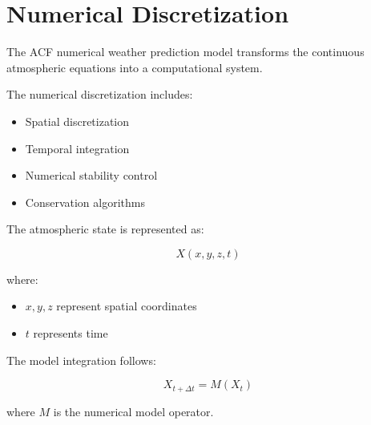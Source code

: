 \section{Numerical Discretization}


The ACF numerical weather prediction model transforms the
continuous atmospheric equations into a computational system.



The numerical discretization includes:


\begin{itemize}

\item Spatial discretization

\item Temporal integration

\item Numerical stability control

\item Conservation algorithms

\end{itemize}



The atmospheric state is represented as:


\[
X(x,y,z,t)
\]


where:


\begin{itemize}

\item $x,y,z$ represent spatial coordinates

\item $t$ represents time

\end{itemize}



The model integration follows:


\[
X_{t+\Delta t}=M(X_t)
\]


where $M$ is the numerical model operator.
